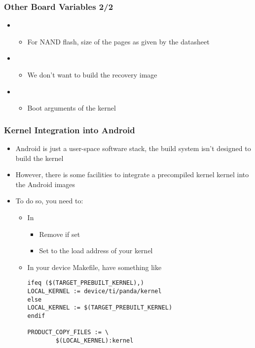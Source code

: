 \begin{frame}
  \frametitle{Other Board Variables 2/2}
  \begin{itemize}
  \item {}
    \begin{itemize}
    \item For NAND flash, size of the pages as given by the datasheet
    \end{itemize}
  \item {}
    \begin{itemize}
    \item We don't want to build the recovery image
    \end{itemize}
  \item {}
    \begin{itemize}
    \item Boot arguments of the kernel
    \end{itemize}
  \end{itemize}
\end{frame}

\begin{frame}[fragile]
  \frametitle{Kernel Integration into Android}
  \begin{itemize}
  \item Android is just a user-space software stack, the build system
    isn't designed to build the kernel
  \item However, there is some facilities to integrate a precompiled
    kernel kernel into the Android images
  \item To do so, you need to:
    \begin{itemize}
    \item In 
      \begin{itemize}
      \item Remove  if set
      \item Set  to the load address of your
        kernel
      \end{itemize}
    \item In your device Makefile, have something like
\begin{verbatim}
ifeq ($(TARGET_PREBUILT_KERNEL),)
LOCAL_KERNEL := device/ti/panda/kernel
else
LOCAL_KERNEL := $(TARGET_PREBUILT_KERNEL)
endif

PRODUCT_COPY_FILES := \
        $(LOCAL_KERNEL):kernel
\end{verbatim}
    \end{itemize}
  \end{itemize}
\end{frame}
